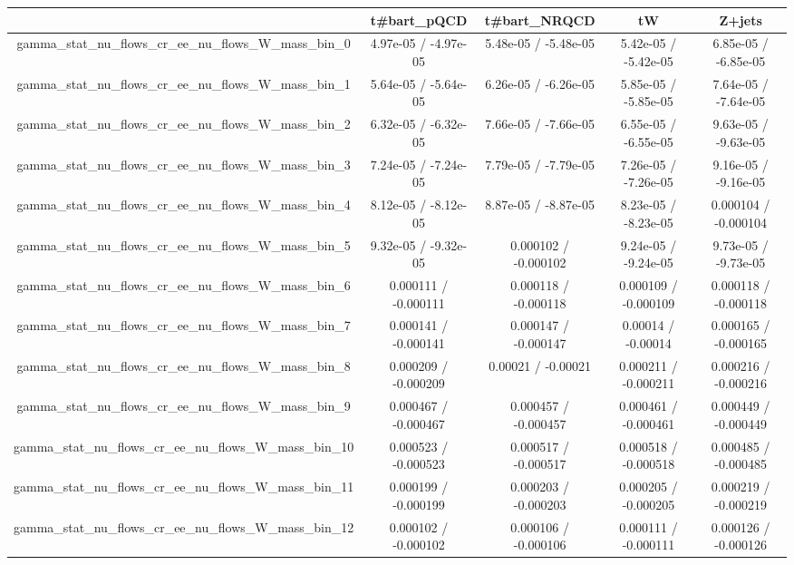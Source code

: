 \documentclass[10pt]{article}
\begin{document}
\begin{table}[htbp]
\begin{center}
\begin{tabular}{|c|c|c|c|c|}
\hline 
      & t#bar{t}_{pQCD}      & t#bar{t}_{NRQCD}      & tW      & Z+jets \\ 
\hline 
  gamma_stat_nu_flows_cr_ee_nu_flows_W_mass_bin_0 & 4.97e-05 / -4.97e-05 & 5.48e-05 / -5.48e-05 & 5.42e-05 / -5.42e-05 & 6.85e-05 / -6.85e-05 \\ 
  gamma_stat_nu_flows_cr_ee_nu_flows_W_mass_bin_1 & 5.64e-05 / -5.64e-05 & 6.26e-05 / -6.26e-05 & 5.85e-05 / -5.85e-05 & 7.64e-05 / -7.64e-05 \\ 
  gamma_stat_nu_flows_cr_ee_nu_flows_W_mass_bin_2 & 6.32e-05 / -6.32e-05 & 7.66e-05 / -7.66e-05 & 6.55e-05 / -6.55e-05 & 9.63e-05 / -9.63e-05 \\ 
  gamma_stat_nu_flows_cr_ee_nu_flows_W_mass_bin_3 & 7.24e-05 / -7.24e-05 & 7.79e-05 / -7.79e-05 & 7.26e-05 / -7.26e-05 & 9.16e-05 / -9.16e-05 \\ 
  gamma_stat_nu_flows_cr_ee_nu_flows_W_mass_bin_4 & 8.12e-05 / -8.12e-05 & 8.87e-05 / -8.87e-05 & 8.23e-05 / -8.23e-05 & 0.000104 / -0.000104 \\ 
  gamma_stat_nu_flows_cr_ee_nu_flows_W_mass_bin_5 & 9.32e-05 / -9.32e-05 & 0.000102 / -0.000102 & 9.24e-05 / -9.24e-05 & 9.73e-05 / -9.73e-05 \\ 
  gamma_stat_nu_flows_cr_ee_nu_flows_W_mass_bin_6 & 0.000111 / -0.000111 & 0.000118 / -0.000118 & 0.000109 / -0.000109 & 0.000118 / -0.000118 \\ 
  gamma_stat_nu_flows_cr_ee_nu_flows_W_mass_bin_7 & 0.000141 / -0.000141 & 0.000147 / -0.000147 & 0.00014 / -0.00014 & 0.000165 / -0.000165 \\ 
  gamma_stat_nu_flows_cr_ee_nu_flows_W_mass_bin_8 & 0.000209 / -0.000209 & 0.00021 / -0.00021 & 0.000211 / -0.000211 & 0.000216 / -0.000216 \\ 
  gamma_stat_nu_flows_cr_ee_nu_flows_W_mass_bin_9 & 0.000467 / -0.000467 & 0.000457 / -0.000457 & 0.000461 / -0.000461 & 0.000449 / -0.000449 \\ 
  gamma_stat_nu_flows_cr_ee_nu_flows_W_mass_bin_10 & 0.000523 / -0.000523 & 0.000517 / -0.000517 & 0.000518 / -0.000518 & 0.000485 / -0.000485 \\ 
  gamma_stat_nu_flows_cr_ee_nu_flows_W_mass_bin_11 & 0.000199 / -0.000199 & 0.000203 / -0.000203 & 0.000205 / -0.000205 & 0.000219 / -0.000219 \\ 
  gamma_stat_nu_flows_cr_ee_nu_flows_W_mass_bin_12 & 0.000102 / -0.000102 & 0.000106 / -0.000106 & 0.000111 / -0.000111 & 0.000126 / -0.000126 \\ 

\end{tabular}
\end{center}
\end{table}
\end{document}
